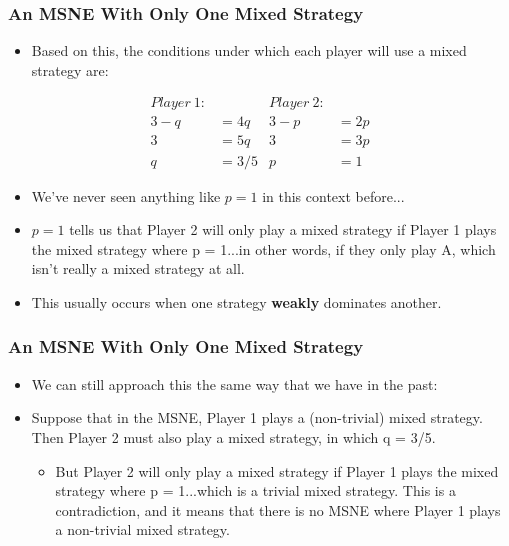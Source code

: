 \begin{frame}
\frametitle{An MSNE With Only One Mixed Strategy}
\begin{itemize}
\item Based on this, the conditions under which each player will use a mixed strategy are:
\end{itemize}
\begin{align*}
Player~1: && Player~2:&\\
3 - q &= 4q & 3 - p &= 2p\\
3 &= 5q & 3 &= 3p\\
q &= 3/5 & p &= 1
\end{align*}
\begin{itemize}
\item We've never seen anything like $p = 1$ in this context before...
\item $p = 1$ tells us that Player 2 will only play a mixed strategy if Player 1 plays the mixed strategy where p = 1...in other words, if they only play A, which isn't really a mixed strategy at all.
\item This usually occurs when one strategy \textbf{weakly} dominates another.
\end{itemize}
\end{frame}

\begin{frame}
\frametitle{An MSNE With Only One Mixed Strategy}
\begin{itemize}
	\item We can still approach this the same way that we have in the past:
	\item Suppose that in the MSNE, Player 1 plays a (non-trivial) mixed strategy. Then Player 2 must also play a mixed strategy, in which q = 3/5.
	\begin{itemize}
		\item But Player 2 will only play a mixed strategy if Player 1 plays the mixed strategy where p = 1...which is a trivial mixed strategy. This is a contradiction, and it means that there is no MSNE where Player 1 plays a non-trivial mixed strategy.
	\end{itemize}
\end{itemize}
\end{frame}

